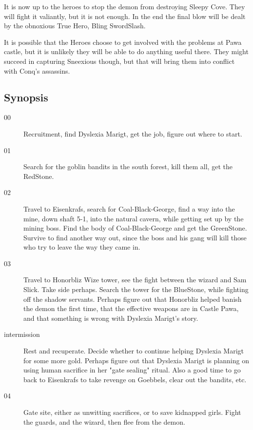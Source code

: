 \documentclass[11pt, twoside, titlepage, a4paper]{report}
\begin{document}
It is now up to the heroes to stop the demon from destroying Sleepy Cove. They will fight it valiantly, but it is not enough. In the end the final blow will be dealt by the obnoxious True Hero, Bling SwordSlash.

It is possible that the Heroes choose to get involved with the problems at Pawa castle, but it is unlikely they will be able to do anything useful there. They might succeed in capturing Sneexious though, but that will bring them into conflict with Conq's assassins.




\subsection*{Synopsis}
\begin{description}

\item[00] Recruitment, find Dyslexia Marigt, get the job, figure out where to start.


\item[01] Search for the goblin bandits in the south forest, kill them all, get the RedStone.


\item[02] Travel to Eisenkrafs, search for Coal-Black-George, find a way into the mine, down shaft 5-1, into the natural cavern, while getting set up by the mining boss. Find the body of Coal-Black-George and get the GreenStone. Survive to find another way out, since the boss and his gang will kill those who try to leave the way they came in.


\item[03] Travel to Honorbliz Wize tower, see the fight between the wizard and Sam Slick. Take side perhaps. Search the tower for the BlueStone, while fighting off the shadow servants. Perhaps figure out that Honorbliz helped banish the demon the first time, that the effective weapons are in Castle Pawa, and that something is wrong with Dyslexia Marigt's story.


\item[intermission] Rest and recuperate. Decide whether to continue helping Dyslexia Marigt for some more gold. Perhaps figure out that Dyslexia Marigt is planning on using human sacrifice in her "gate sealing" ritual. Also a good time to go back to Eisenkrafs to take revenge on Goebbels, clear out the bandits, etc.


\item[04] Gate site, either as unwitting sacrifices, or to save kidnapped girls. Fight the guards, and the wizard, then flee from the demon.



\end{description}
\end{document}
